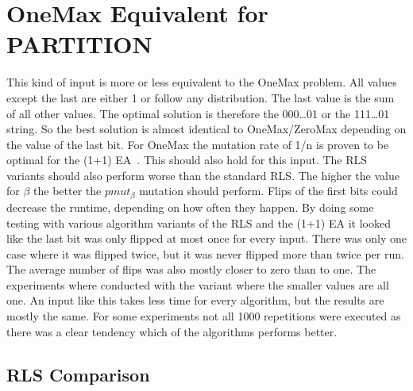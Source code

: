\section{OneMax Equivalent for PARTITION}
This kind of input is more or less equivalent to the OneMax problem. All values except the last are either 1 or follow any distribution. The last value is the sum of all other values. The optimal solution is therefore the 000\dots01 or
the 111\dots01 string. So the best solution is almost identical to OneMax/ZeroMax depending on the value of the last bit.\newline
For OneMax the mutation rate of 1/n is proven to be optimal for the (1+1) EA~\cite{witt2013tight}.
This should also hold for this input.
The RLS variants should also perform worse than the standard RLS.
The higher the value for $\beta$ the better the $pmut_\beta$ mutation should perform.
Flips of the first bits could decrease the runtime, depending on how often they happen.
By doing some testing with various algorithm variants of the RLS and the (1+1) EA it looked like the last bit was only flipped at most once for every input.
There was only one case where it was flipped twice, but it was never flipped more than twice per run.
The average number of flips was also mostly closer to zero than to one.\newline
The experiments where conducted with the variant where the smaller values are all one.
An input like this takes less time for every algorithm, but the results are mostly the same.
For some experiments not all 1000 repetitions were executed as there was a clear tendency which of the algorithms performs better.
\subsection{RLS Comparison}




